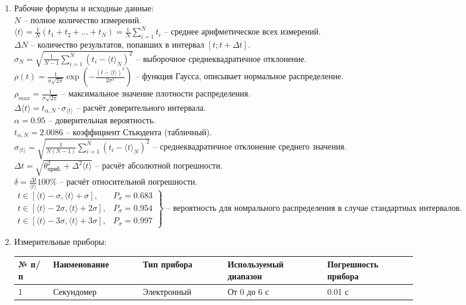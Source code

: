 \documentclass[12pt]{article}
\begin{document}
\begin{enumerate}
    \item Рабочие формулы и исходные данные: \\
    $N$ -- полное количество измерений. \\
    $\langle t\rangle = \frac{1}{N}(t_1 + t_2 + \dots + t_N) = \frac{1}{N}\sum\limits_{i=1}^N t_i$ -- среднее арифметическое всех измерений. \\
    $\Delta N$ -- количество результатов, попавших в интервал $[t; t + \Delta t]$. \\
    $\sigma_N = \sqrt{\frac{1}{N-1} \sum\limits_{i=1}^N (t_i - \langle t\rangle_N)^2}$ -- выборочное среднеквадратичное отклонение. \\
    $\rho(t) = \frac{1}{\sigma\sqrt{2\pi}}\exp\left(-\frac{\left(t - \langle t\rangle\right)^2}{2\sigma^2}\right)$ -- функция Гаусса, описывает нормальное распределение. \\
    $\rho_{max} = \frac{1}{\sigma \sqrt{2 \pi}}$ -- максимальное значение плотности распределения. \\
    $\Delta\langle t\rangle = t_{\alpha, N}\cdot\sigma_{\langle t\rangle}$ -- расчёт доверительного интервала. \\
    $\alpha = 0.95$ -- доверительная вероятность. \\
    $t_{\alpha, N} = 2.0086$ -- коэффициент Стьюдента (табличный). \\
    $\sigma_{\langle t\rangle} = \sqrt{\frac{1}{N(N-1)}\sum\limits_{i=1}^N\left(t_i - \langle t\rangle_N\right)^2}$ -- среднеквадратичное отклонение среднего значения. \\
    $\Delta t = \sqrt{\theta_{\text{приб.}}^2 + \Delta^2 \langle t\rangle}$ -- расчёт абсолютной погрешности. \\
    $\delta = \frac{\Delta t}{\langle t\rangle}100\%$ -- расчёт относительной погрешности. \\
    $\left.\begin{array}{ll}
        t \in [\langle t\rangle - \sigma, \langle t\rangle + \sigma], & P_\sigma = 0.683 \\
        t \in [\langle t\rangle - 2\sigma, \langle t\rangle + 2\sigma], & P_\sigma = 0.954 \\
        t \in [\langle t\rangle - 3\sigma, \langle t\rangle + 3\sigma], & P_\sigma = 0.997
    \end{array}\right\}$ -- вероятность для номрального распределения в случае стандартных интервалов.

    \item Измерительные приборы: \\    
    \begin{tabular}{|m{0.07\linewidth}|m{0.18\linewidth}|m{0.17\linewidth}|m{0.2\linewidth}|m{0.18\linewidth}|}
        \hline
        № п/п & Наименование & Тип прибора & \makecell{Используемый\\ диапазон} & \makecell{Погрешность\\ прибора} \\
        \hline
        1 & Секундомер & Электронный & От 0 до 6 с & 0.01 с \\
        \hline
    \end{tabular}


\end{enumerate}
\end{document}
